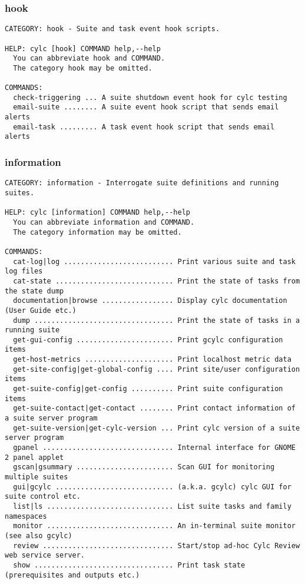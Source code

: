 \subsubsection{hook}
\label{hook}
\begin{lstlisting}
CATEGORY: hook - Suite and task event hook scripts.

HELP: cylc [hook] COMMAND help,--help
  You can abbreviate hook and COMMAND.
  The category hook may be omitted.

COMMANDS:
  check-triggering ... A suite shutdown event hook for cylc testing
  email-suite ........ A suite event hook script that sends email alerts
  email-task ......... A task event hook script that sends email alerts
\end{lstlisting}
\subsubsection{information}
\label{information}
\begin{lstlisting}
CATEGORY: information - Interrogate suite definitions and running suites.

HELP: cylc [information] COMMAND help,--help
  You can abbreviate information and COMMAND.
  The category information may be omitted.

COMMANDS:
  cat-log|log .......................... Print various suite and task log files
  cat-state ............................ Print the state of tasks from the state dump
  documentation|browse ................. Display cylc documentation (User Guide etc.)
  dump ................................. Print the state of tasks in a running suite
  get-gui-config ....................... Print gcylc configuration items
  get-host-metrics ..................... Print localhost metric data
  get-site-config|get-global-config .... Print site/user configuration items
  get-suite-config|get-config .......... Print suite configuration items
  get-suite-contact|get-contact ........ Print contact information of a suite server program
  get-suite-version|get-cylc-version ... Print cylc version of a suite server program
  gpanel ............................... Internal interface for GNOME 2 panel applet
  gscan|gsummary ....................... Scan GUI for monitoring multiple suites
  gui|gcylc ............................ (a.k.a. gcylc) cylc GUI for suite control etc.
  list|ls .............................. List suite tasks and family namespaces
  monitor .............................. An in-terminal suite monitor (see also gcylc)
  review ............................... Start/stop ad-hoc Cylc Review web service server.
  show ................................. Print task state (prerequisites and outputs etc.)
\end{lstlisting}
